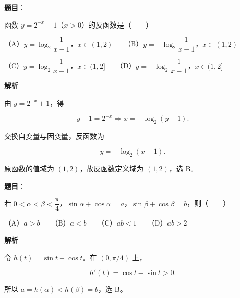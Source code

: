 \begin{answer}

\textbf{题目}：

函数 $y=2^{-x}+1$（$x>0$）的反函数是\mbox{（　　）}

（A）$y=\log_2\dfrac1{x-1}$，$x\in(1,2)$　　（B）$y=-\log_2\dfrac1{x-1}$，$x\in(1,2)$

（C）$y=\log_2\dfrac1{x-1}$，$x\in(1,2]$　　（D）$y=-\log_2\dfrac1{x-1}$，$x\in(1,2]$

\textbf{解析}

由 $y=2^{-x}+1$，得

\nopagebreak[4]
\[
y-1=2^{-x}
\Longrightarrow x=-\log_2(y-1).
\]

交换自变量与因变量，反函数为

\nopagebreak[4]
\[
y=-\log_2(x-1).
\]

原函数的值域为 $(1,2)$，故反函数定义域为 $(1,2)$，选 B。


\end{answer}
\begin{answer}

\textbf{题目}：

若 $0<\alpha<\beta<\dfrac\pi4$，$\sin\alpha+\cos\alpha=a$，$\sin\beta+\cos\beta=b$，则\mbox{（　　）}

（A）$a>b$　　（B）$a<b$　　（C）$ab<1$　　（D）$ab>2$

\textbf{解析}

令 $h(t)=\sin t+\cos t$。在 $(0,\pi/4)$ 上，

\nopagebreak[4]
\[
h'(t)=\cos t-\sin t>0.
\]

所以 $a=h(\alpha)<h(\beta)=b$，选 B。


\end{answer}

